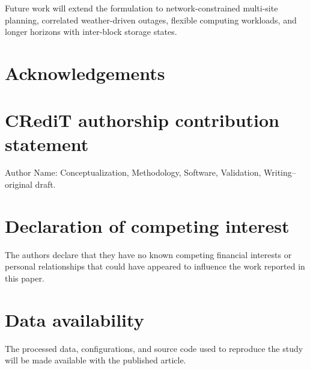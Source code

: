 \documentclass[times]{elsarticle}
\begin{document}

Future work will extend the formulation to network-constrained multi-site
planning, correlated weather-driven outages, flexible computing workloads, and
longer horizons with inter-block storage states.

\section*{Acknowledgements}

\section*{CRediT authorship contribution statement}
Author Name: Conceptualization, Methodology, Software, Validation,
Writing--original draft.

\section*{Declaration of competing interest}
The authors declare that they have no known competing financial interests or
personal relationships that could have appeared to influence the work reported
in this paper.

\section*{Data availability}
The processed data, configurations, and source code used to reproduce the study
will be made available with the published article.



\end{document}

